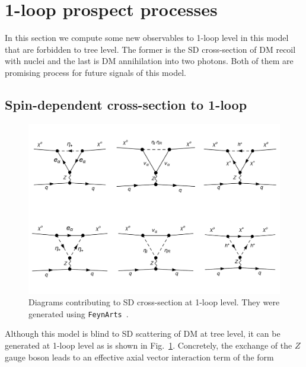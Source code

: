 \documentclass[12pt,letterpaper]{article}
\begin{document}
 







\section{1-loop prospect processes}
\label{sec:1-loop-processes}

In this section we compute some new observables to 1-loop level in this model that are forbidden to tree level. The former is the SD cross-section of DM recoil with nuclei and the last is DM annihilation into two photons. Both of them are promising process for future signals of this model.

\subsection{Spin-dependent cross-section to 1-loop}
\label{sec:sigma-SD}
%
\begin{figure}[h]
\begin{center}
\includegraphics[scale=0.45]{SD-diagrams}
\caption{ Diagrams contributing to SD cross-section at 1-loop level. They were generated using \texttt{FeynArts}~\cite{Hahn:2000kx}. }
\label{fig:SD}
\end{center}
\end{figure}
%
Although this model is blind to SD scattering of DM at tree level, it can be generated at 1-loop level as is shown in Fig.~\ref{fig:SD}. Concretely,  the exchange of the  $Z$ gauge boson leads to an effective axial vector interaction term of the form~\cite{Jungman:1995df, Ibarra:2016dlb}
\end{document}
